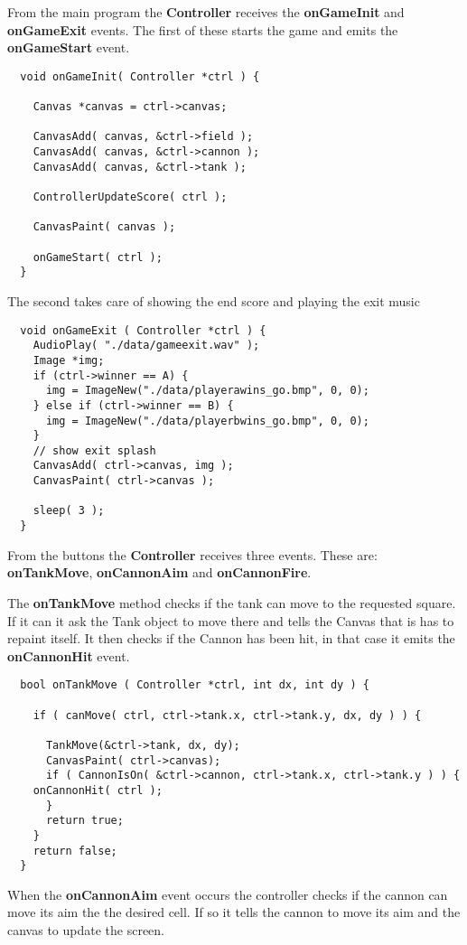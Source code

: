 From the main program the {\bf Controller} receives the {\bf onGameInit} and {\bf onGameExit} events.
The first of these starts the game and emits the {\bf onGameStart} event.
\begin{lstlisting}
  void onGameInit( Controller *ctrl ) {

    Canvas *canvas = ctrl->canvas;

    CanvasAdd( canvas, &ctrl->field );
    CanvasAdd( canvas, &ctrl->cannon );
    CanvasAdd( canvas, &ctrl->tank );

    ControllerUpdateScore( ctrl );

    CanvasPaint( canvas );

    onGameStart( ctrl );
  }
\end{lstlisting}

The second takes care of showing the end score and playing the exit music
\begin{lstlisting}
  void onGameExit ( Controller *ctrl ) {
    AudioPlay( "./data/gameexit.wav" );
    Image *img;
    if (ctrl->winner == A) {
      img = ImageNew("./data/playerawins_go.bmp", 0, 0);
    } else if (ctrl->winner == B) {
      img = ImageNew("./data/playerbwins_go.bmp", 0, 0);
    }
    // show exit splash
    CanvasAdd( ctrl->canvas, img );
    CanvasPaint( ctrl->canvas );

    sleep( 3 );
  }
\end{lstlisting}

From the buttons the {\bf Controller} receives three events. These are: {\bf onTankMove},
{\bf onCannonAim} and {\bf onCannonFire}.

The {\bf onTankMove} method checks if the tank can move to the requested square. If it
can it ask the Tank object to move there and tells the Canvas that is has to repaint itself.
It then checks if the Cannon has been hit, in that case it emits the {\bf onCannonHit} event.
\begin{lstlisting}
  bool onTankMove ( Controller *ctrl, int dx, int dy ) {

    if ( canMove( ctrl, ctrl->tank.x, ctrl->tank.y, dx, dy ) ) {

      TankMove(&ctrl->tank, dx, dy);
      CanvasPaint( ctrl->canvas);
      if ( CannonIsOn( &ctrl->cannon, ctrl->tank.x, ctrl->tank.y ) ) {
	onCannonHit( ctrl );
      }
      return true;
    }
    return false;
  }
\end{lstlisting}

When the {\bf onCannonAim} event occurs the controller checks if the cannon can move its
aim the the desired cell. If so it tells the cannon to move its aim and the canvas to update
the screen.


